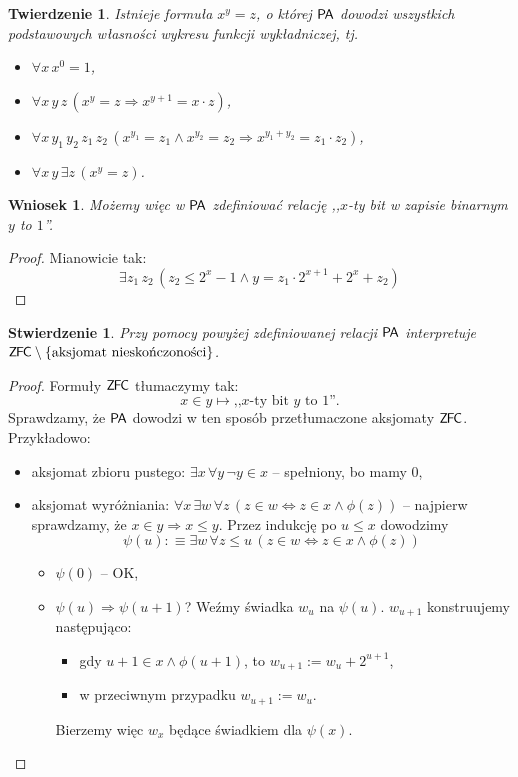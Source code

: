 \documentclass{article}
\theoremstyle{plain}
\newtheorem{tw}[thm]{Twierdzenie}
\newtheorem{stw}[thm]{Stwierdzenie}
\newtheorem{wn}[thm]{Wniosek}
\theoremstyle{definition}
\theoremstyle{remark}
\newcommand{\PA}{\mathsf{P \mkern-1.9mu A}}
\newcommand{\ZFC}{\mathsf{Z \mkern-1.6mu F \mkern-1.5mu C}}
\begin{document}
\begin{tw}
	 Istnieje formuła $x^y=z$, o której $\PA$ dowodzi wszystkich
	 podstawowych własności wykresu funkcji wykładniczej, tj.
	 \begin{itemize}
		 \item $\forall x \, x^0=1$,
		 \item $\forall x\, y\, z \, (x^y=z \Rightarrow x^{y+1} = x
			 \cdot z)$,
		 \item $\forall x\, y_1\, y_2\, z_1\, z_2 \, (x^{y_1} = z_1
			 \wedge x^{y_2} = z_2 \Rightarrow x^{y_1 + y_2} = z_1
			 \cdot z_2)$,
		 \item $\forall x\, y \, \exists z \, (x^y = z)$.
	 \end{itemize}
\end{tw}

\begin{wn}
	 Możemy więc w $\PA$ zdefiniować relację ,,$x$-ty bit w zapisie
	 binarnym $y$ to $1$''.
\end{wn}
\begin{proof}
	Mianowicie tak:
	\[
		 \exists z_1 \, z_2 \, (z_2 \leq 2^x - 1 \wedge y = z_1 \cdot
		 2^{x+1} + 2^x + z_2)
	\]
\end{proof}

\begin{stw}
	Przy pomocy powyżej zdefiniowanej relacji $\PA$ interpretuje
	$\ZFC \setminus \{\text{aksjomat nieskończoności}\}$.
\end{stw}
\begin{proof}
	 Formuły $\ZFC$ tłumaczymy tak:
	 \[
		 x \in y \mapsto \text{,,}x\text{-ty bit }y\text{ to }1\text{''}.
	 \]
	Sprawdzamy, że $\PA$ dowodzi w ten sposób przetłumaczone aksjomaty $\ZFC$.
	Przykładowo:
	\begin{itemize}
		\item aksjomat zbioru pustego: $\exists x \, \forall y \, \neg
			y \in x$ -- spełniony, bo mamy $0$,
		\item aksjomat wyróżniania: $\forall x \, \exists w \, \forall
			z \, (z \in w \Leftrightarrow z \in x \wedge \phi(z))$
			-- najpierw sprawdzamy, że $x \in y \Rightarrow x \leq y$.
			Przez indukcję po $u \leq x$ dowodzimy
			\[
				 \psi(u) :\equiv \exists w \, \forall z \leq u
				 \, (z \in w \Leftrightarrow z \in x \wedge
				 \phi(z))
			\]
			\begin{itemize}
				\item $\psi(0)$ -- OK,
				\item $\psi(u) \Rightarrow \psi(u+1)$?
					Weźmy świadka $w_u$ na $\psi(u)$.
					$w_{u+1}$ konstruujemy następująco:
					\begin{itemize}
						\item gdy $u+1 \in x \wedge
							\phi(u+1)$, to $w_{u+1}
							:= w_u + 2^{u+1}$,
						\item w przeciwnym przypadku
							$w_{u+1} := w_u$.
					\end{itemize}
					Bierzemy więc $w_x$ będące świadkiem
					dla $\psi(x)$.
			\end{itemize}


	\end{itemize}

\end{proof}
\end{document}
